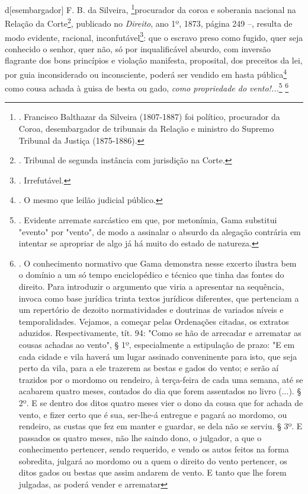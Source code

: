 d{[}esembargador{]} F. B. da Silveira, \footnote{. Francisco Balthazar
  da Silveira (1807-1887) foi político, procurador da Coroa,
  desembargador de tribunais da Relação e ministro do Supremo Tribunal
  da Justiça (1875-1886).}procurador da coroa e soberania nacional na
Relação da Corte\footnote{. Tribunal de segunda instância com jurisdição
  na Corte.}, publicado no \emph{Direito}, ano 1º, 1873, página 249 --,
resulta de modo evidente, racional, inconfutável\footnote{. Irrefutável.}:
que o escravo preso como fugido, quer seja conhecido o senhor, quer não,
só por inqualificável absurdo, com inversão flagrante dos bons
princípios e violação manifesta, proposital, dos preceitos da lei, por
guia inconsiderado ou inconsciente, poderá ser vendido em hasta
pública\footnote{. O mesmo que leilão judicial público.} como cousa
achada à guisa de besta ou gado, \emph{como propriedade do
vento!...}\footnote{. Evidente arremate sarcástico em que, por
  metonímia, Gama substitui "evento" por "vento", de modo a assinalar o
  absurdo da alegação contrária em intentar se apropriar de algo já há
  muito do estado de natureza.} \footnote{. O conhecimento normativo que
  Gama demonstra nesse excerto ilustra bem o domínio a um só tempo
  enciclopédico e técnico que tinha das fontes do direito. Para
  introduzir o argumento que viria a apresentar na sequência, invoca
  como base jurídica trinta textos jurídicos diferentes, que pertenciam
  a um repertório de dezoito normatividades e doutrinas de variados
  níveis e temporalidades. Vejamos, a começar pelas Ordenações citadas,
  os extratos aduzidos. Respectivamente, tít. 94: "Como se hão de
  arrecadar e arrematar as cousas achadas ao vento", § 1º, especialmente
  a estipulação de prazo: "E em cada cidade e vila haverá um lugar
  assinado conveninente para isto, que seja perto da vila, para a ele
  trazerem as bestas e gados do vento; e serão aí trazidos por o mordomo
  ou rendeiro, à terça-feira de cada uma semana, até se acabarem quatro
  meses, contados do dia que forem assentados no livro (...). § 2º. E se
  dentro dos ditos quatro meses vier o dono da cousa que for achada de
  vento, e fizer certo que é sua, ser-lhe-á entregue e pagará ao
  mordomo, ou rendeiro, as custas que fez em manter e guardar, se dela
  não se serviu. § 3º. E passados os quatro meses, não lhe saindo dono,
  o julgador, a que o conhecimento pertencer, sendo requerido, e vendo
  os autos feitos na forma sobredita, julgará ao mordomo ou a quem o
  direito do vento pertencer, os ditos gados ou bestas que assim andarem
  de vento. E tanto que lhe forem julgadas, as poderá vender e arrematar
}
